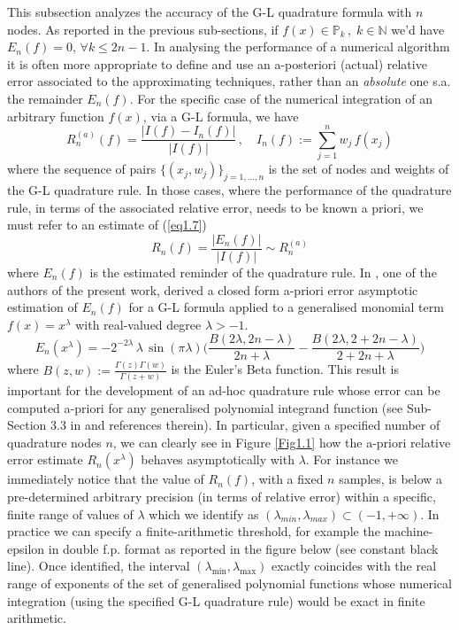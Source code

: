 \documentclass[a4paper, twosided]{book}
\begin{document}
This subsection analyzes the accuracy of the G-L quadrature formula with $n$ nodes. As reported in the previous sub-sections, if $f(x)\in\mathbb{P}_k\,,\;k\in\mathbb{N}$ we'd have $E_n(f)=0,\,\forall k\leq2n-1$.  
In analysing the performance of a numerical algorithm it is often more appropriate to define and use an a-posteriori (actual) relative error associated to the approximating techniques, rather than an {\itshape absolute} one s.a. the remainder $E_n(f)$. For the specific case of the numerical integration of an arbitrary function $f(x)$, via a G-L formula, we have
\begin{equation}\label{eq1.7}
    R_n^{(a)}(f) = \frac{|I(f)-I_n(f)|}{|I(f)|}\,,\quad I_n(f):=\sum_{j=1}^{n}w_j\,f(x_j)
\end{equation}
\noindent
where the sequence of pairs $\{(x_j,w_j)\}_{j=1,...,n}$ is the set of nodes and weights of the G-L quadrature rule. In those cases, where the performance of the quadrature rule, in terms of the associated relative error, needs to be known a priori, we must refer to an estimate of (\ref{eq1.7}) 
\begin{equation}\label{eq1.8}
    R_n(f) = \frac{|E_n(f)|}{|I(f)|} \sim R_n^{(a)}
\end{equation}
where $E_n(f)$ is the estimated reminder of the quadrature rule. In \cite{Lombardi09}, one of the authors of the present work, derived a closed form a-priori error asymptotic estimation of $E_n(f)$ for a G-L formula applied to a generalised monomial term $f(x)=x^\lambda$ with real-valued degree $\lambda>-1$.
\begin{equation}\label{eq1.9}
    E_n(x^\lambda) = -2^{-2\lambda}\,\lambda\,\sin(\pi \lambda) \bigg(\frac{B(2\lambda,2n-\lambda)}{2n+\lambda} - \frac{B(2\lambda, 2+2n-\lambda)}{2+2n+\lambda}\bigg)
\end{equation}
\noindent
where $B(z,w):=\frac{\Gamma(z)\Gamma(w)}{\Gamma(z+w)}$ is the Euler's Beta function. This result is important for the development of an ad-hoc quadrature rule whose error can be computed a-priori for any generalised polynomial integrand function (see Sub-Section 3.3 in \cite{Lombardi21} and references therein). In particular, given a specified number of quadrature nodes $n$, we can clearly see in Figure \ref{Fig1.1} how the a-priori relative error estimate $R_n(x^\lambda)$ behaves asymptotically with $\lambda$. For instance we immediately notice that the value of $R_n(f)$, with a fixed $n$ samples, is below a pre-determined arbitrary precision (in terms of relative error) within a specific, finite range of values of $\lambda$ which we identify as $(\lambda_{min},\lambda_{max})\subset(-1,+\infty)$. In practice we can specify a finite-arithmetic threshold, for example the machine-epsilon in double f.p. format as reported in the figure below (see constant black line). Once identified, the interval $(\lambda_{\text{min}}, \lambda_{\text{max}})$ exactly coincides with the real range of exponents of the set of generalised polynomial functions whose numerical integration (using the specified G-L quadrature rule) would be exact in finite arithmetic.
\end{document}

